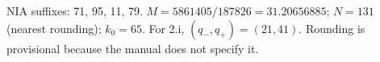 NIA suffixes: 71, 95, 11, 79. $M=5861405/187826=31.20656885$; $N=131$ (nearest rounding); $k_0=65$. For 2.i, $(q_-,q_+)=(21,41)$. Rounding is provisional because the manual does not specify it.
